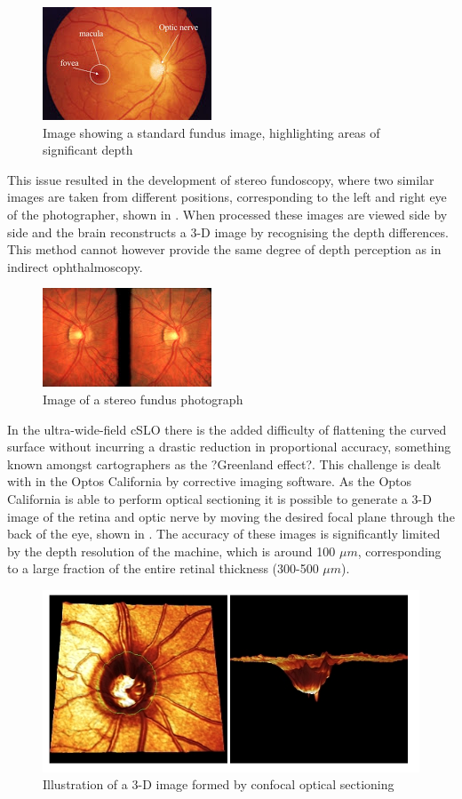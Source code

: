 \begin{figure}[H]
\centering
\includegraphics{figures/normalfundus}
\caption{Image showing a  standard fundus image, highlighting areas of significant depth}
\label{fig:standard}
   \end{figure}

This issue resulted in the development of stereo fundoscopy, where
two similar images are taken from different positions, corresponding
to the left and right eye of the photographer, shown in .
When processed these images are viewed side by side and the brain
reconstructs a 3-D image by recognising the depth differences.\cite{tyler1997stereo}
This method cannot however provide the same degree of depth perception
as in indirect ophthalmoscopy.

\begin{figure}[H]
\centering
\includegraphics{figures/stereo}
\caption{Image of a stereo fundus photograph}
\label{fig:stereo}
   \end{figure}


In the ultra-wide-field cSLO there is the added difficulty of flattening
the curved surface without incurring a drastic reduction in proportional
accuracy, something known amongst cartographers as the ?Greenland effect?.
This challenge is dealt with in the Optos California by corrective imaging
software. As the Optos California is able to perform optical sectioning it
is possible to generate a 3-D image of the retina and optic nerve by moving
the desired focal plane through the back of the eye, shown in .
The accuracy of these images is significantly limited by the depth resolution
of the machine, which is around 100 $\mu m$, corresponding to  a large
fraction of the entire retinal thickness (300-500 $\mu m$).

\begin{figure}[H]
\centering
\includegraphics{figures/3dcslo}
\caption{Illustration of a 3-D image formed by confocal optical sectioning}
\label{fig:3d}
   \end{figure}

